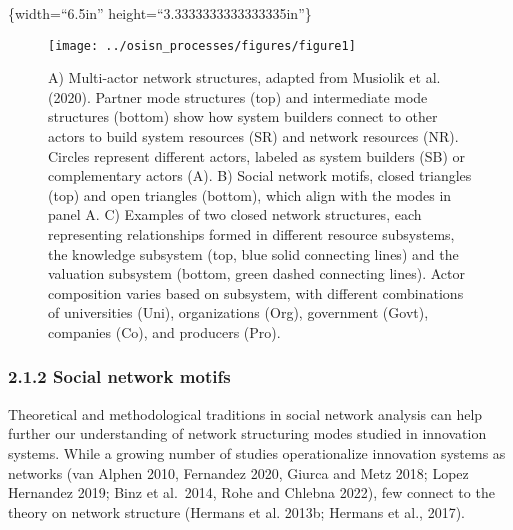 \documentclass[twoside,12pt,final]{ucthesis-CA2012}
\begin{document}
\begin{ucmainmatter}
\{width=``6.5in'' height=``3.3333333333333335in''\}
\begin{figure}

{\centering \texttt{[image: ../osisn\_processes/figures/figure1]} 

}

\caption{A) Multi-actor network structures, adapted from Musiolik et al. (2020). Partner mode structures (top) and intermediate mode structures (bottom) show how system builders connect to other actors to build system resources (SR) and network resources (NR). Circles represent different actors, labeled as system builders (SB) or complementary actors (A). B) Social network motifs, closed triangles (top) and open triangles (bottom), which align with the modes in panel A. C) Examples of two closed network structures, each representing relationships formed in different resource subsystems, the knowledge subsystem (top, blue solid connecting lines) and the valuation subsystem (bottom, green dashed connecting lines). Actor composition varies based on subsystem, with different combinations of universities (Uni), organizations (Org), government (Govt), companies (Co), and producers (Pro).}\label{fig:unnamed-chunk-21}
\end{figure}
\hypertarget{social-network-motifs}{%
\subsubsection{2.1.2 Social network motifs}\label{social-network-motifs}}

Theoretical and methodological traditions in social network analysis can
help further our understanding of network structuring modes studied in
innovation systems. While a growing number of studies operationalize
innovation systems as networks (van Alphen 2010, Fernandez 2020, Giurca
and Metz 2018; Lopez Hernandez 2019; Binz et al.~2014, Rohe and Chlebna
2022), few connect to the theory on network structure (Hermans et al.
2013b; Hermans et al., 2017).


\end{ucmainmatter}
\end{document}
